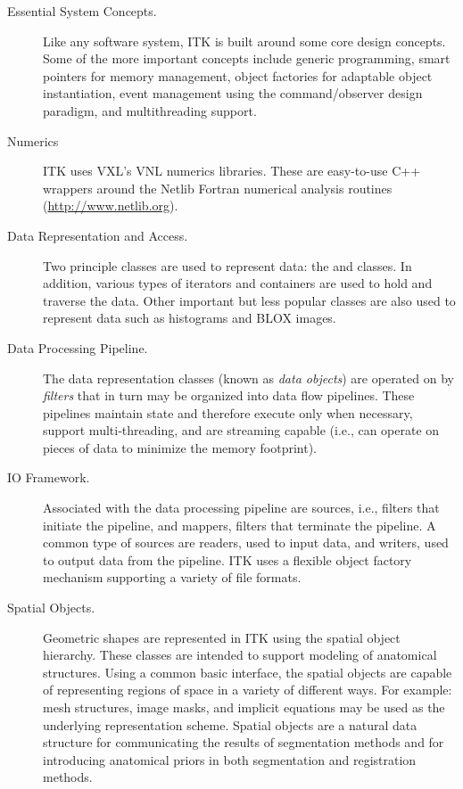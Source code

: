 \begin{description}
	\item[Essential System Concepts.] Like any software system, ITK is
        built around some core design concepts. Some of the more important
        concepts include generic programming, smart pointers for memory
        management, object factories for adaptable object instantiation,
        event management using the command/observer design paradigm, and
        multithreading support.

	\item[Numerics] ITK uses VXL's VNL numerics libraries. These are
        easy-to-use C++ wrappers around the Netlib Fortran numerical 
        analysis routines (\url{http://www.netlib.org}).

	\item[Data Representation and Access.]  Two principle classes are
        used to represent data: the  and 
        classes.  In addition, various types of iterators and containers are
        used to hold and traverse the data. Other important but less popular
        classes are also used to represent data such as histograms and BLOX
        images.

	\item[Data Processing Pipeline.]  The data representation classes
        (known as \emph{data objects}) are operated on by \emph{filters} that
        in turn may be organized into data flow pipelines. These pipelines
        maintain state and therefore execute only when necessary, support
        multi-threading, and are streaming capable (i.e., can operate on
        pieces of data to minimize the memory footprint).

        \item[IO Framework.] Associated with the data processing pipeline are
        sources, i.e., filters that initiate the pipeline, and mappers,
        filters that terminate the pipeline. A common type of
        sources are readers, used to input data, and writers, used to
        output data from the pipeline. ITK uses a flexible object factory
        mechanism supporting a variety of file formats.

	\item[Spatial Objects.] Geometric shapes are represented in ITK using
        the spatial object hierarchy.  These classes are intended to support
        modeling of anatomical structures. Using a common basic interface,
        the spatial objects are capable of representing regions of space in a
        variety of different ways. For example: mesh structures, image masks,
        and implicit equations may be used as the underlying representation
        scheme.  Spatial objects are a natural data structure for
        communicating the results of segmentation methods and for introducing
        anatomical priors in both segmentation and registration methods.


\end{description}
